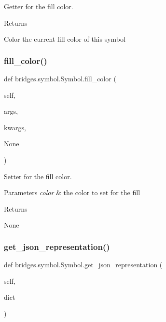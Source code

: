 Getter for the fill color. 

\begin{DoxyReturn}{Returns}


Color the current fill color of this symbol 
\end{DoxyReturn}
\mbox{\label{classbridges_1_1symbol_1_1_symbol_acec37468f0018db1416622062983eb46}} 
\subsubsection{\texorpdfstring{fill\+\_\+color()}{fill\_color()}\hspace{0.1cm}{\footnotesize\ttfamily [2/2]}}
{\footnotesize\ttfamily def bridges.\+symbol.\+Symbol.\+fill\+\_\+color (\begin{DoxyParamCaption}\item[{}]{self,  }\item[{}]{args,  }\item[{}]{kwargs,  }\item[{}]{None }\end{DoxyParamCaption})}



Setter for the fill color. 


\begin{DoxyParams}{Parameters}
{\em color} & the color to set for the fill \\
\hline
\end{DoxyParams}
\begin{DoxyReturn}{Returns}


None 
\end{DoxyReturn}
\mbox{\label{classbridges_1_1symbol_1_1_symbol_a746f8e6d1fd1c63c8a9140a2af7436f8}} 
\subsubsection{\texorpdfstring{get\+\_\+json\+\_\+representation()}{get\_json\_representation()}}
{\footnotesize\ttfamily def bridges.\+symbol.\+Symbol.\+get\+\_\+json\+\_\+representation (\begin{DoxyParamCaption}\item[{}]{self,  }\item[{}]{dict }\end{DoxyParamCaption})}



